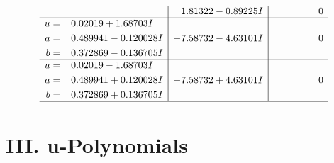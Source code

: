 \documentclass[1p]{elsarticle_modified}
\theoremstyle{definition}
\begin{document}
$$\begin{array}{c|c|c}
 & \phantom{-}1.81322 - 0.89225 I & \phantom{-0.000000 } 0 \\ \hline\begin{aligned}
u &= \phantom{-}0.02019 + 1.68703 I \\
a &= \phantom{-}0.489941 - 0.120028 I \\
b &= \phantom{-}0.372869 - 0.136705 I\end{aligned}
 & -7.58732 - 4.63101 I & \phantom{-0.000000 } 0 \\ \hline\begin{aligned}
u &= \phantom{-}0.02019 - 1.68703 I \\
a &= \phantom{-}0.489941 + 0.120028 I \\
b &= \phantom{-}0.372869 + 0.136705 I\end{aligned}
 & -7.58732 + 4.63101 I & \phantom{-0.000000 } 0\\
 \hline 
 \end{array}$$\newpage
\newpage\renewcommand{\arraystretch}{1}
\centering \section*{ III. u-Polynomials}
\end{document}

